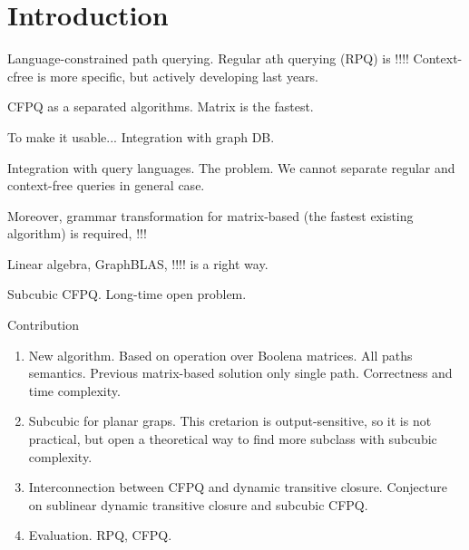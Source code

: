 \section{Introduction}


Language-constrained path querying. 
Regular ath querying (RPQ) is !!!!
Context-cfree is more specific, but actively developing last years.

CFPQ as a separated algorithms. Matrix is the fastest. 

To make it usable... Integration with graph DB.

Integration with query languages. 
The problem. We cannot separate regular and context-free queries in general case.  

Moreover, grammar transformation for matrix-based (the fastest existing algorithm) is required, !!!

Linear algebra, GraphBLAS, !!!! is a right way.

Subcubic CFPQ. Long-time open problem.

Contribution
\begin{enumerate}
	\item New algorithm. Based on operation over Boolena matrices. All paths semantics. Previous matrix-based solution only single path. Correctness and time complexity.
	\item Subcubic for planar graps. This cretarion is output-sensitive, so it is not practical, but open a theoretical way to find more subclass with subcubic complexity.
	\item Interconnection between CFPQ and dynamic transitive closure. Conjecture on sublinear dynamic transitive closure and subcubic CFPQ. 
	\item Evaluation. RPQ, CFPQ. 
\end{enumerate}
